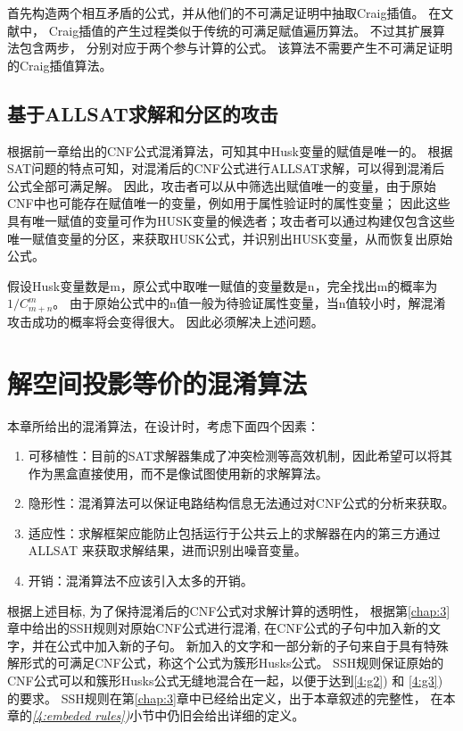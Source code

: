 首先构造两个相互矛盾的公式，并从他们的不可满足证明中抽取Craig插值。
在文献中，
Craig插值的产生过程类似于传统的可满足赋值遍历算法。
不过其扩展算法包含两步，
分别对应于两个参与计算的公式。
该算法不需要产生不可满足证明的Craig插值算法。

\subsection{基于ALLSAT求解和分区的攻击}
根据前一章给出的CNF公式混淆算法，可知其中Husk变量的赋值是唯一的。
根据SAT问题的特点可知，对混淆后的CNF公式进行ALLSAT求解，可以得到混淆后公式全部可满足解。
因此，攻击者可以从中筛选出赋值唯一的变量，由于原始CNF中也可能存在赋值唯一的变量，例如用于属性验证时的属性变量；
因此这些具有唯一赋值的变量可作为HUSK变量的候选者；攻击者可以通过构建仅包含这些唯一赋值变量的分区，来获取HUSK公式，并识别出HUSK变量，从而恢复出原始公式。

假设Husk变量数是m，原公式中取唯一赋值的变量数是n，完全找出m的概率为$1/{C_{m+n}^m}$。	
由于原始公式中的n值一般为待验证属性变量，当n值较小时，解混淆攻击成功的概率将会变得很大。
因此必须解决上述问题。



\section{解空间投影等价的混淆算法}
本章所给出的混淆算法，在设计时，考虑下面四个因素：

\begin{enumerate}
 \item
可移植性：目前的SAT求解器集成了冲突检测等高效机制，因此希望可以将其作为黑盒直接使用，而不是像\cite{OBfuscationd-CNFs}试图使用新的求解算法。
 \item \label{4:g2}
隐形性：混淆算法可以保证电路结构信息无法通过对CNF公式的分析来获取。
\item \label{4:g3}
适应性：求解框架应能防止包括运行于公共云上的求解器在内的第三方通过ALLSAT 来获取求解结果，进而识别出噪音变量。
 \item
开销：混淆算法不应该引入太多的开销。
\end{enumerate}
根据上述目标,
为了保持混淆后的CNF公式对求解计算的透明性，
根据第\ref{chap:3}章中给出的SSH规则对原始CNF公式进行混淆,
在CNF公式的子句中加入新的文字，并在公式中加入新的子句。
新加入的文字和一部分新的子句来自于具有特殊解形式的可满足CNF公式，称这个公式为簇形Husks公式。
SSH规则保证原始的CNF公式可以和簇形Husks公式无缝地混合在一起，以便于达到\ref{4:g2}) 和 \ref{4:g3}) 的要求。
SSH规则在第\ref{chap:3}章中已经给出定义，出于本章叙述的完整性，
在本章的\textit{\ref{4:embeded rules})}小节中仍旧会给出详细的定义。

